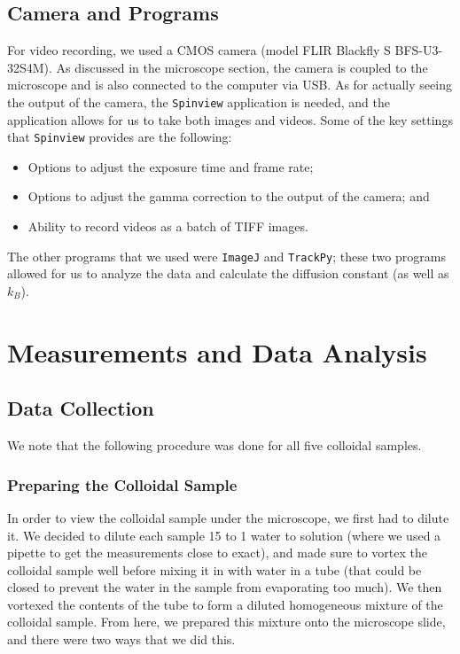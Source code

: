 \documentclass[twocolumn,amsmath,amssymb,pra, floatfix]{revtex4-2}
\begin{document}
\subsection{Camera and Programs}
For video recording, we used a CMOS camera (model FLIR Blackfly S BFS-U3-32S4M). As discussed in the microscope section, the camera is coupled to the microscope and is also connected to the computer via USB. As for actually seeing the output of the camera, the \texttt{Spinview} application is needed, and the application allows for us to take both images and videos. Some of the key settings that \texttt{Spinview} provides are the following:
\begin{itemize}
    \item Options to adjust the exposure time and frame rate;
    \item Options to adjust the gamma correction to the output of the camera; and
    \item Ability to record videos as a batch of TIFF images.
\end{itemize}
The other programs that we used were \texttt{ImageJ} and \texttt{TrackPy}; these two programs allowed for us to analyze the data and calculate the diffusion constant (as well as $k_{B}$).

\section{Measurements and Data Analysis}

\subsection{Data Collection}
We note that the following procedure was done for all five colloidal samples. 

\subsubsection{Preparing the Colloidal Sample}
In order to view the colloidal sample under the microscope, we first had to dilute it. We decided to dilute each sample 15 to 1 water to solution (where we used a pipette to get the measurements close to exact), and made sure to vortex the colloidal sample well before mixing it in with water in a tube (that could be closed to prevent the water in the sample from evaporating too much). We then vortexed the contents of the tube to form a diluted homogeneous mixture of the colloidal sample. From here, we prepared this mixture onto the microscope slide, and there were two ways that we did this.
\end{document}
